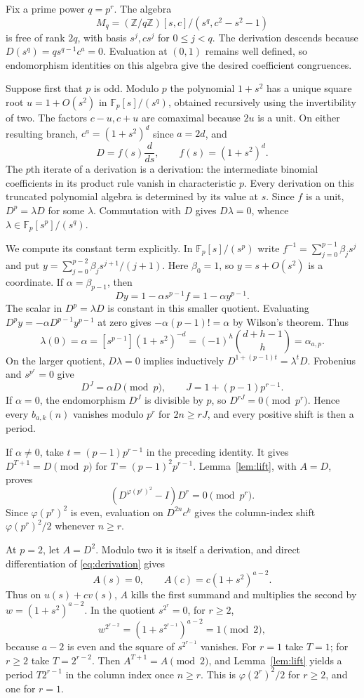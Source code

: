 \documentclass[11pt]{article}
\newcommand{\ZZ}{\mathbb Z}
\newcommand{\FF}{\mathbb F}
\begin{document}
Fix a prime power $q=p^r$. The algebra
\[
 M_q=(\ZZ/q\ZZ)[s,c]/(s^q,c^2-s^2-1)
\]
is free of rank $2q$, with basis $s^j,cs^j$ for $0\le j<q$.
The derivation descends because $D(s^q)=qs^{q-1}c^a=0$. Evaluation at
$(0,1)$ remains well defined, so endomorphism identities on this algebra give
the desired coefficient congruences.

Suppose first that $p$ is odd. Modulo $p$ the polynomial $1+s^2$ has a unique
square root $u=1+O(s^2)$ in $\FF_p[s]/(s^q)$, obtained recursively using the
invertibility of two. The factors $c-u,c+u$ are comaximal because $2u$ is a
unit. On either resulting branch, $c^a=(1+s^2)^d$ since $a=2d$, and
\[
 D=f(s)\frac{d}{ds},\qquad f(s)=(1+s^2)^d.
\]
The $p$th iterate of a derivation is a derivation: the intermediate binomial
coefficients in its product rule vanish in characteristic $p$.
Every derivation on this truncated polynomial algebra is determined by its
value at $s$. Since $f$ is a unit, $D^p=\lambda D$ for some $\lambda$.
Commutation with $D$ gives $D\lambda=0$, whence
$\lambda\in\FF_p[s^p]/(s^q)$.

We compute its constant term explicitly. In $\FF_p[s]/(s^p)$ write
$f^{-1}=\sum_{j=0}^{p-1}\beta_js^j$ and put
$y=\sum_{j=0}^{p-2}\beta_js^{j+1}/(j+1)$.
Here $\beta_0=1$, so $y=s+O(s^2)$ is a coordinate. If
$\alpha=\beta_{p-1}$, then
\[
 Dy=1-\alpha s^{p-1}f=1-\alpha y^{p-1}.
\]
The scalar in $D^p=\lambda D$ is constant in this smaller quotient.
Evaluating $D^py=-\alpha D^{p-1}y^{p-1}$ at zero gives
$-\alpha(p-1)!=\alpha$ by Wilson's theorem. Thus
\[
 \lambda(0)=\alpha=[s^{p-1}](1+s^2)^{-d}
     =(-1)^h\binom{d+h-1}{h}=\alpha_{a,p}.
\]
On the larger quotient, $D\lambda=0$ implies inductively
$D^{1+(p-1)t}=\lambda^tD$. Frobenius and $s^{p^r}=0$ give
\begin{equation}\label{eq:restricted}
 D^J=\alpha D\pmod p,\qquad J=1+(p-1)p^{r-1}.
\end{equation}
If $\alpha=0$, the endomorphism $D^J$ is divisible by $p$, so
$D^{rJ}=0\pmod{p^r}$. Hence every $b_{a,k}(n)$ vanishes modulo $p^r$
for $2n\ge rJ$, and every positive shift is then a period.

If $\alpha\ne0$, take $t=(p-1)p^{r-1}$ in the preceding identity.
It gives $D^{T+1}=D\pmod p$ for $T=(p-1)^2p^{r-1}$.
Lemma~\ref{lem:lift}, with $A=D$, proves
\[
 (D^{\varphi(p^r)^2}-I)D^r=0\pmod{p^r}.
\]
Since $\varphi(p^r)^2$ is even, evaluation on $D^{2n}c^k$ gives the
column-index shift $\varphi(p^r)^2/2$ whenever $n\ge r$.

At $p=2$, let $A=D^2$. Modulo two it is itself a derivation, and direct
differentiation of \eqref{eq:derivation} gives
\[
 A(s)=0,\qquad A(c)=c(1+s^2)^{a-2}.
\]
Thus on $u(s)+cv(s)$, $A$ kills the first summand and multiplies the second
by $w=(1+s^2)^{a-2}$. In the quotient $s^{2^r}=0$, for $r\ge2$,
\[
 w^{2^{r-2}}=(1+s^{2^{r-1}})^{a-2}=1\pmod2,
\]
because $a-2$ is even and the square of $s^{2^{r-1}}$ vanishes.
For $r=1$ take $T=1$; for $r\ge2$ take $T=2^{r-2}$.
Then $A^{T+1}=A\pmod2$, and Lemma~\ref{lem:lift} yields a period
$T2^{r-1}$ in the column index once $n\ge r$.
This is $\varphi(2^r)^2/2$ for $r\ge2$, and one for $r=1$.
\end{document}
